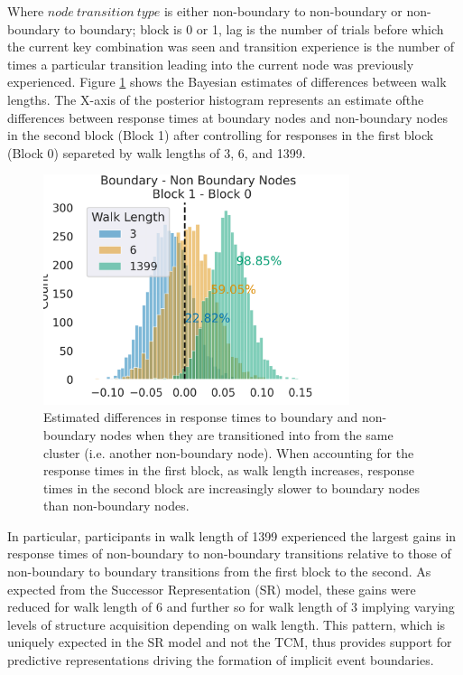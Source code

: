 Where $node\ transition\ type$ is either non-boundary to non-boundary or non-boundary to boundary; block is 0 or 1, lag is the number of trials before which the current key combination was seen and transition experience is the number of times a particular transition leading into the current node was previously experienced. Figure \ref{fig:bayesmodel-firsttwoblocks} shows the Bayesian estimates of differences between walk lengths. \ac{The X-axis of the posterior histogram represents an estimate ofthe differences between response times at boundary nodes and non-boundary nodes in the second block (Block 1) after controlling for responses in the first block (Block 0) separeted by walk lengths of 3, 6, and 1399.}

\begin{figure}[h]
	\centering
	\includegraphics[width = 0.8\textwidth]{chapter_notebooks/chapter_2/figures/nb_b_diff.png}
	\caption{\ac{Estimated} differences in response times to boundary and non-boundary nodes when they are transitioned into from the same cluster (i.e. another non-boundary node). When accounting for the response times in the first block, as walk length increases, response times in the second block are increasingly slower to boundary nodes than non-boundary nodes.}
	\label{fig:bayesmodel-firsttwoblocks}
\end{figure}

In particular, participants in walk length of 1399 experienced the largest gains in response times of non-boundary to non-boundary transitions relative to those of non-boundary to boundary transitions from the first block to the second. As expected from the Successor Representation (SR) model, these gains were reduced for walk length of 6 and further so for walk length of 3 implying varying levels of structure acquisition depending on walk length. This pattern, which is uniquely expected in the SR model and not the TCM, thus provides support for predictive representations driving the formation of implicit event boundaries. 

